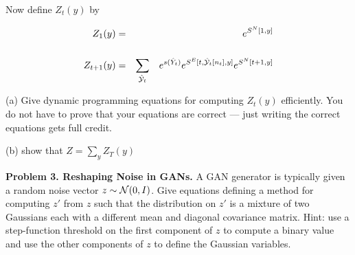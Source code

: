     Now define $Z_t(y)$ by

    \begin{eqnarray*}
      Z_1(y) & = & e^{S^N[1,y]} \\
      \\
      Z_{t+1}(y) & = & \sum_{\hat{\cal Y}_t}\;\;\;e^{s(\hat{Y}_t)}e^{S^E[t,\hat{\cal Y}_t[n_t],y]}e^{S^N[t+1,y]}
    \end{eqnarray*}

    \medskip
    (a) Give dynamic programming equations for computing $Z_t(y)$ efficiently. You do not have to prove that your equations are correct --- just writing the correct equations gets full credit.

    
    \medskip
    (b) show that $Z = \sum_y Z_T(y)$

    
    \bigskip 

    {\bf Problem 3. Reshaping Noise in GANs.} A GAN generator is typically given a random noise vector $z \sim {\cal N}(0,I)$.  Give equations defining a method for computing $z'$ from $z$ such that
    the distribution on $z'$ is a
    mixture of two Gaussians each with a different mean and diagonal covariance matrix.  Hint: use a step-function threshold on the first component of $z$ to compute a binary value and use the other components
    of $z$ to define the Gaussian variables.

    
    

